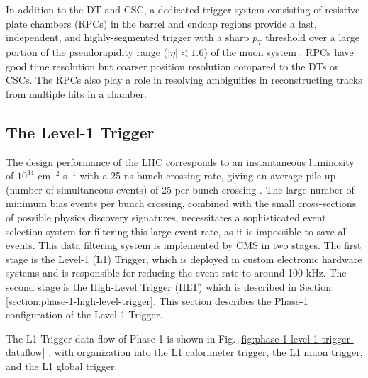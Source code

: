 In addition to the DT and CSC, a dedicated trigger system consisting of resistive plate chambers (RPCs) in the barrel and endcap regions provide a fast, independent, and highly-segmented trigger with a sharp $p_T$ threshold over a large portion of the pseudorapidity range ($|\eta| < 1.6$) of the muon system \cite{CMS-2008-JINST-3-S08004}. RPCs have good time resolution but coarser position resolution compared to the DTs or CSCs. The RPCs also play a role in resolving ambiguities in reconstructing tracks from multiple hits in a chamber. 

\subsection{The Level-1 Trigger}
\label{section:phase-1-l1-trigger}
The design performance of the LHC corresponds to an instantaneous luminosity of $10^{34}$ cm$^{-2}$ s$^{-1}$ with a 25 ns bunch crossing rate, giving an average pile-up (number of simultaneous events) of 25 per bunch crossing \cite{CMS-TDR-012}. The large number of minimum bias events per bunch crossing, combined with the small cross-sections of possible physics discovery signatures, necessitates a sophisticated event selection system for filtering this large event rate, as it is impossible to save all events. This data filtering system is implemented by CMS in two stages. The first stage is the Level-1 (L1) Trigger, which is deployed in custom electronic hardware systems and is responsible for reducing the event rate to around 100 kHz. The second stage is the High-Level Trigger (HLT) which is described in Section \ref{section:phase-1-high-level-trigger}. This section describes the Phase-1 configuration of the Level-1 Trigger.


The L1 Trigger data flow of Phase-1 is shown in Fig. \ref{fig:phase-1-level-1-trigger-dataflow} \cite{CMS-TDR-012}, with organization into the L1 calorimeter trigger, the L1 muon trigger, and the L1 global trigger. 

